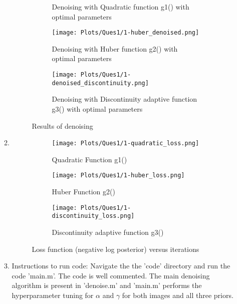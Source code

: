 \documentclass[11pt]{article}
\begin{document}
\begin{enumerate}
\begin{enumerate}
\begin{figure}[H]
\begin{subfigure}[b]{0.4\textwidth}
                 \caption{Denoising with Quadratic function g1() with optimal parameters}
            \end{subfigure}
            \begin{subfigure}[b]{0.4\textwidth}
                 \centering
                 \texttt{[image: Plots/Ques1/1-huber\_denoised.png]}
                 \caption{Denoising with Huber function g2() with optimal parameters}
            \end{subfigure}
            \begin{subfigure}[b]{0.4\textwidth}
                 \centering
                 \texttt{[image: Plots/Ques1/1-denoised\_discontinuity.png]}
                 \caption{Denoising with Discontinuity adaptive function g3() with optimal parameters}
            \end{subfigure}
            \caption{Results of denoising}
            \label{fig:my_label}
        \end{figure}
        
        \item \begin{figure}[H]
            \centering
            \begin{subfigure}[b]{0.4\textwidth}
                 \centering
                 \texttt{[image: Plots/Ques1/1-quadratic\_loss.png]}
                 \caption{Quadratic Function g1()}
            \end{subfigure}
            \begin{subfigure}[b]{0.4\textwidth}
                 \centering
                 \texttt{[image: Plots/Ques1/1-huber\_loss.png]}
                 \caption{Huber Function g2()}
            \end{subfigure}
            \begin{subfigure}[b]{0.4\textwidth}
                 \centering
                 \texttt{[image: Plots/Ques1/1-discontinuity\_loss.png]}
                 \caption{Discontinuity adaptive function g3()}
            \end{subfigure}
            
            \caption{Loss function (negative log posterior) versus iterations}
            \label{fig:my_label}
        \end{figure}
        \item Instructions to run code: Navigate the the 'code' directory and run the code 'main.m'. The code is well commented. The main denoising algorithm is present in 'denoise.m' and 'main.m' performs the hyperparameter tuning for $\alpha$ and $\gamma$ for both images and all three priors.  
    \end{enumerate}
    

\end{enumerate}
\end{document}
